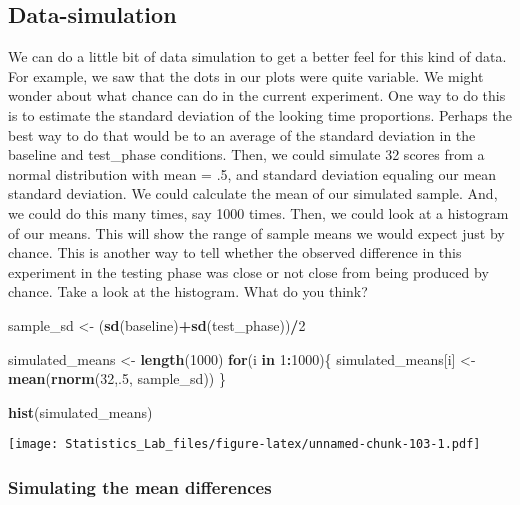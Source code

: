 \documentclass[
]{book}
\newenvironment{Shaded}{\begin{snugshade}}{\end{snugshade}}
\newcommand{\ControlFlowTok}[1]{\textcolor[rgb]{0.13,0.29,0.53}{\textbf{#1}}}
\newcommand{\DecValTok}[1]{\textcolor[rgb]{0.00,0.00,0.81}{#1}}
\newcommand{\FunctionTok}[1]{\textcolor[rgb]{0.13,0.29,0.53}{\textbf{#1}}}
\newcommand{\NormalTok}[1]{#1}
\newcommand{\OtherTok}[1]{\textcolor[rgb]{0.56,0.35,0.01}{#1}}
\newcommand{\SpecialCharTok}[1]{\textcolor[rgb]{0.81,0.36,0.00}{\textbf{#1}}}
\begin{document}
\hypertarget{data-simulation}{%
\subsection{Data-simulation}\label{data-simulation}}

We can do a little bit of data simulation to get a better feel for this kind of data. For example, we saw that the dots in our plots were quite variable. We might wonder about what chance can do in the current experiment. One way to do this is to estimate the standard deviation of the looking time proportions. Perhaps the best way to do that would be to an average of the standard deviation in the baseline and test\_phase conditions. Then, we could simulate 32 scores from a normal distribution with mean = .5, and standard deviation equaling our mean standard deviation. We could calculate the mean of our simulated sample. And, we could do this many times, say 1000 times. Then, we could look at a histogram of our means. This will show the range of sample means we would expect just by chance. This is another way to tell whether the observed difference in this experiment in the testing phase was close or not close from being produced by chance. Take a look at the histogram. What do you think?

\begin{Shaded}
\begin{Highlighting}[]
\NormalTok{sample\_sd   }\OtherTok{\textless{}{-}}\NormalTok{ (}\FunctionTok{sd}\NormalTok{(baseline)}\SpecialCharTok{+}\FunctionTok{sd}\NormalTok{(test\_phase))}\SpecialCharTok{/}\DecValTok{2}

\NormalTok{simulated\_means }\OtherTok{\textless{}{-}} \FunctionTok{length}\NormalTok{(}\DecValTok{1000}\NormalTok{)}
\ControlFlowTok{for}\NormalTok{(i }\ControlFlowTok{in} \DecValTok{1}\SpecialCharTok{:}\DecValTok{1000}\NormalTok{)\{}
\NormalTok{ simulated\_means[i] }\OtherTok{\textless{}{-}} \FunctionTok{mean}\NormalTok{(}\FunctionTok{rnorm}\NormalTok{(}\DecValTok{32}\NormalTok{,.}\DecValTok{5}\NormalTok{, sample\_sd))}
\NormalTok{\}}

\FunctionTok{hist}\NormalTok{(simulated\_means)}
\end{Highlighting}
\end{Shaded}

\texttt{[image: Statistics\_Lab\_files/figure-latex/unnamed-chunk-103-1.pdf]}

\hypertarget{simulating-the-mean-differences}{%
\subsubsection{Simulating the mean differences}\label{simulating-the-mean-differences}}
\end{document}
